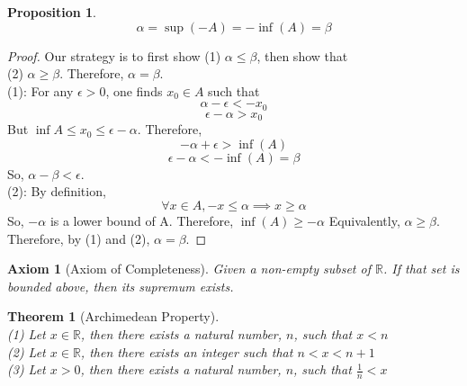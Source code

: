 \documentclass[12pt,reqno]{amsart}
\theoremstyle{plain}
\newtheorem*{axiom}{Axiom}
\newtheorem*{theorem}{Theorem}
\newtheorem*{proposition}{Proposition}
\begin{document}
    \vspace{10 mm}

    \begin{proposition}
        \[ \alpha = \sup{(-A)} = -\inf{(A)} = \beta \]
    \end{proposition}
    \begin{proof}
        Our strategy is to first show (1) $\alpha \le \beta$, then show that \\(2) $\alpha \ge \beta$. Therefore, $\alpha = \beta$. \\
        (1): For any $\epsilon > 0$, one finds $x_0 \in A$ such that
        \[ \alpha - \epsilon < -x_0\]
        \[ \epsilon - \alpha > x_0 \]
        But $\inf{A} \le x_0 \le \epsilon - \alpha$. Therefore,
        \[ -\alpha + \epsilon > \inf{(A)}\]
        \[ \epsilon - \alpha < -\inf{(A)} = \beta\]
        So, $\alpha - \beta < \epsilon$. \\
        (2): By definition,
        \[ \forall x \in A, -x \le \alpha \implies x \ge \alpha\]
        So, $-\alpha$ is a lower bound of A. Therefore, $\inf{(A)} \ge -\alpha$
        Equivalently, $\alpha \ge \beta$. \\
        Therefore, by (1) and (2), $\alpha = \beta$.
    \end{proof}

    \pagebreak

    \begin{axiom}[Axiom of Completeness]
        Given a non-empty subset of $\mathbb{R}$. If that set is bounded above, then its supremum exists.
    \end{axiom}

    \begin{theorem}[Archimedean Property] \hfill \\
        (1) Let $x \in \mathbb{R}$, then there exists a natural number, $n$, such that $x < n$ \\
        (2) Let $x \in \mathbb{R}$, then there exists an integer such that $n < x < n+1$ \\
        (3) Let $x > 0$, then there exists a natural number, $n$, such that $\frac1n < x$
    \end{theorem}
\end{document}
